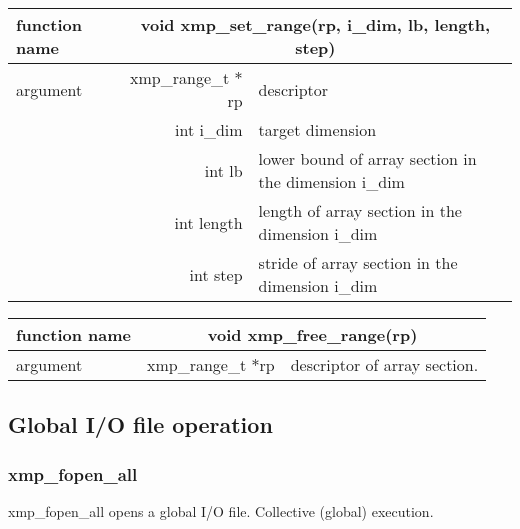    \begin{table}[h]
    \begin{center}
      \begin{tabular}{|l|r|p{90mm}|}
      \hline
          {\bf function name}  & \multicolumn{2}{c|}{\bf void xmp\_set\_range(rp, i\_dim, lb, length, step)}  \\ \hline
          argument & xmp\_range\_t $*$rp  & descriptor \\ \cline{2-3}
          & int i\_dim & target dimension \\ \cline{2-3}
          & int lb & lower bound of array section in the dimension i\_dim \\ \cline{2-3}
          & int length & length of array section in the dimension i\_dim \\ \cline{2-3}
          & int step & stride of array section in the dimension i\_dim \\ \hline
      \end{tabular}
     \end{center}
    \label{tb:aaa}
   \end{table}
   
   \begin{table}[h]
    \begin{center}
      \begin{tabular}{|l|r|p{90mm}|}
      \hline
      {\bf function name}  & \multicolumn{2}{c|}{\bf void xmp\_free\_range(rp)}  \\ \hline
      argument & xmp\_range\_t $*$rp & descriptor of array section. \\ \hline
      \end{tabular}
     \end{center}
    \label{tb:aaa}
   \end{table}
   

   \subsection{Global I/O file operation}

   \subsubsection{xmp\_fopen\_all}
   xmp\_fopen\_all opens a global I/O file. Collective (global) execution.
   
